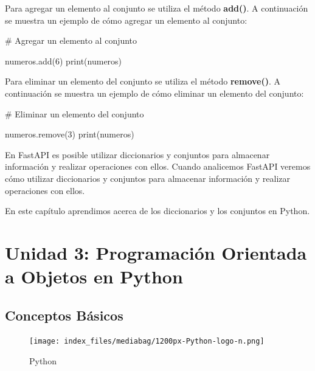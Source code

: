 \documentclass[
  a4paper,
  DIV=11,
  numbers=noendperiod,
  onepage,
  openany]{scrreprt}
\newenvironment{Shaded}{\begin{snugshade}}{\end{snugshade}}
\newcommand{\BuiltInTok}[1]{\textcolor[rgb]{0.00,0.23,0.31}{#1}}
\newcommand{\CommentTok}[1]{\textcolor[rgb]{0.37,0.37,0.37}{#1}}
\newcommand{\DecValTok}[1]{\textcolor[rgb]{0.68,0.00,0.00}{#1}}
\newcommand{\NormalTok}[1]{\textcolor[rgb]{0.00,0.23,0.31}{#1}}
\begin{document}
Para agregar un elemento al conjunto se utiliza el método
\textbf{add()}. A continuación se muestra un ejemplo de cómo agregar un
elemento al conjunto:

\begin{Shaded}
\begin{Highlighting}[]
\CommentTok{\# Agregar un elemento al conjunto}

\NormalTok{numeros.add(}\DecValTok{6}\NormalTok{)}
\BuiltInTok{print}\NormalTok{(numeros)}
\end{Highlighting}
\end{Shaded}

Para eliminar un elemento del conjunto se utiliza el método
\textbf{remove()}. A continuación se muestra un ejemplo de cómo eliminar
un elemento del conjunto:

\begin{Shaded}
\begin{Highlighting}[]
\CommentTok{\# Eliminar un elemento del conjunto}

\NormalTok{numeros.remove(}\DecValTok{3}\NormalTok{)}
\BuiltInTok{print}\NormalTok{(numeros)}
\end{Highlighting}
\end{Shaded}

En FastAPI es posible utilizar diccionarios y conjuntos para almacenar
información y realizar operaciones con ellos. Cuando analicemos FastAPI
veremos cómo utilizar diccionarios y conjuntos para almacenar
información y realizar operaciones con ellos.

En este capítulo aprendimos acerca de los diccionarios y los conjuntos
en Python.

\part{Unidad 3: Programación Orientada a Objetos en Python}

\chapter{Conceptos Básicos}\label{conceptos-buxe1sicos}

\begin{figure}[H]

{\centering \texttt{[image: index\_files/mediabag/1200px-Python-logo-n.png]}

}

\caption{Python}

\end{figure}%
\end{document}
